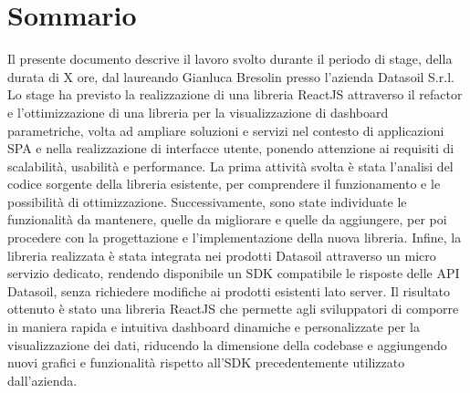 \cleardoublepage
{}
{}
\begingroup
\let\clearpage\relax
\let\cleardoublepage\relax
\chapter*{Sommario}

Il presente documento descrive il lavoro svolto durante il periodo di stage, della durata di X ore, dal laureando Gianluca Bresolin
presso l'azienda Datasoil S.r.l. Lo stage ha previsto la realizzazione di una libreria ReactJS attraverso il refactor
e l'ottimizzazione di una libreria per la visualizzazione di dashboard parametriche, volta ad ampliare soluzioni e servizi 
nel contesto di applicazioni SPA e nella realizzazione di interfacce utente, ponendo attenzione ai requisiti di scalabilità,
usabilità e performance. \n
La prima attività svolta è stata l'analisi del codice sorgente della libreria esistente, per comprendere il funzionamento e le possibilità
di ottimizzazione. Successivamente, sono state individuate le funzionalità da mantenere, quelle da migliorare e quelle da aggiungere,
per poi procedere con la progettazione e l'implementazione della nuova libreria. \n
Infine, la libreria realizzata è stata integrata nei prodotti Datasoil attraverso un micro servizio dedicato, rendendo disponibile un SDK
compatibile le risposte delle API Datasoil, senza richiedere modifiche ai prodotti esistenti lato server. \n
Il risultato ottenuto è stato una libreria ReactJS che permette agli sviluppatori di comporre in maniera rapida e intuitiva dashboard
dinamiche e personalizzate per la visualizzazione dei dati, riducendo la dimensione della codebase e aggiungendo nuovi grafici e funzionalità
rispetto all'SDK precedentemente utilizzato dall'azienda.


\endgroup
\vfill
